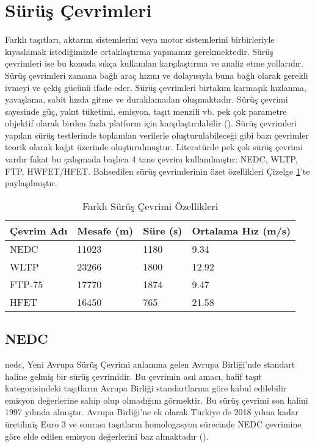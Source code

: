 \section{Sürüş Çevrimleri}
\label{suruscevrimlerilit}
Farklı taşıtları, aktarım sistemlerini veya motor sistemlerini birbirleriyle kıyaslamak istediğimizde ortaklaştırma yapmamız gerekmektedir.
Sürüş çevrimleri ise bu konuda sıkça kullanılan karşılaştırma ve analiz etme yollarıdır. Sürüş çevrimleri zamana bağlı araç hızını ve dolayısıyla
buna bağlı olarak gerekli ivmeyi ve çekiş gücünü ifade eder. Sürüş çevrimleri birtakım karmaşık hızlanma, yavaşlama, sabit hızda gitme ve duraklamadan oluşmaktadır.
Sürüş çevrimi sayesinde güç, yakıt tüketimi, emisyon, taşıt menzili vb. pek çok parametre objektif olarak birden fazla platform için karşılaştırılabilir (\cite{suruscevriminedir}).
Sürüş çevrimleri yapılan sürüş testlerinde toplanılan verilerle oluşturulabileceği gibi bazı çevrimler teorik olarak kağıt üzerinde oluşturulmuştur.
Literatürde pek çok sürüş çevrimi vardır fakat bu çalışmada başlıca 4 tane çevrim kullanılmıştır: NEDC, WLTP, FTP, HWFET/HFET. 
Bahsedilen sürüş çevrimlerinin özet özellikleri Çizelge \ref{tab:drivingcycletable}'te paylaşılmıştır.

\begin{table}
    \centering
    \caption{Farklı Sürüş Çevrimi Özellikleri}\label{tab:drivingcycletable}
    \begin{tabular}{|l|l|l|l|}
    \hline
    \textbf{Çevrim Adı} & \textbf{Mesafe (m)} & \textbf{Süre (s)} & \textbf{Ortalama Hız (m/s)} \\ \hline
    NEDC                & 11023               & 1180              & 9.34                        \\ \hline
    WLTP                & 23266               & 1800              & 12.92                       \\ \hline
    FTP-75              & 17770               & 1874              & 9.47                        \\ \hline
    HFET                & 16450               & 765               & 21.58                       \\ \hline
\end{tabular}
\end{table}

\subsection{NEDC}
\label{nedc}
\acrfull{nedc}, Yeni Avrupa Sürüş Çevrimi anlamına gelen Avrupa Birliği'nde standart haline gelmiş bir sürüş çevrimidir. Bu çevrimin asıl amacı, hafif taşıt kategorisindeki taşıtların Avrupa Birliği standartlarına göre 
kabul edilebilir emisyon değerlerine sahip olup olmadığını görmektir. Bu sürüş çevrimi son halini 1997 yılında almıştır. Avrupa Birliği'ne ek olarak Türkiye de 2018 yılına kadar üretilmiş Euro 3 ve sonrası taşıtların homologasyon sürecinde
NEDC çevrimine göre elde edilen emisyon değerlerini baz almaktadır (\cite{nedcnedir}). 

